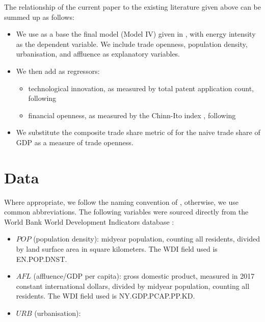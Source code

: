 \documentclass[12pt,a4paper]{article}
\begin{document}
The relationship of the current paper to the existing literature given above can be summed up as follows: 
\begin{itemize}
\item We use as a base the final model (Model IV) given in \cite{rafiqUrbanizationOpennessEmissions2016}, with energy intensity as the dependent variable. We include trade openness, population density, urbanisation, and affluence as explanatory variables.
\item We then add as regressors:
\begin{itemize}
\item technological innovation, as measured by total patent application count, following \cite{panHowIndustrializationTrade2019}
\item financial openness, as measured by the Chinn-Ito index \citep{chinnWhatMattersFinancial2006}, following \cite{koengkanPositiveImpactTrade2018}
\end{itemize}
\item We substitute the composite trade share metric of \cite{squalliNewMeasureTrade2011} for the naive trade share of GDP as a measure of trade openness.
\end{itemize}

\section{Data}\label{sec:data}
Where appropriate, we follow the naming convention of \cite{rafiqUrbanizationOpennessEmissions2016}, otherwise, we use common abbreviations.
The following variables were sourced directly from the World Bank World Development Indicators database \citep{theworldbankWorldDevelopmentIndicators2019}:
\begin{itemize}
\item $POP$ (population density): midyear population, counting all residents, divided by land surface area in square kilometers. The WDI field used is EN.POP.DNST.
\item $AFL$ (affluence/GDP per capita): gross domestic product, measured in 2017 constant international dollars, divided by midyear population, counting all residents. The WDI field used is NY.GDP.PCAP.PP.KD.
\item $URB$ (urbanisation): 
\end{itemize}
\end{document}
